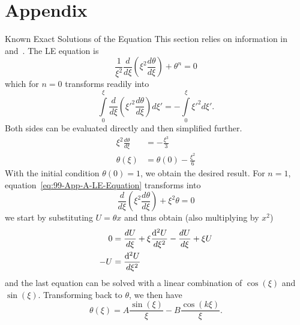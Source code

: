 \appendix
{}
\renewcommand{\thesection}{\Alph{section}}
\renewcommand{\thesubsection}{\Alph{subsection}}
\renewcommand\thetheorem{\thesubsection.\arabic{theorem}}

\section*{Appendix}
%
%
\begin{subsection}{Known Exact Solutions of the \texorpdfstring{}{LE} Equation}
\label{99-App-A-Exact-LE-Solutions}
This section relies on information in~\cite{weissteinLaneEmdenDifferentialEquation2020} and~\cite{chandrasekharChandrasekharAnIntroductionStudy1958}.
The \ac{LE} equation is
\begin{equation}
	\frac{1}{\xi^2}\frac{d}{d\xi}\left(\xi^2\frac{d\theta}{d\xi}\right)+\theta^n=0
	\label{eq:99-App-A-LE-Equation}
\end{equation}
which for $n=0$ transforms readily into
\begin{equation}
	\int\limits_0^\xi\frac{d}{d\xi}\left(\xi'^2\frac{d\theta}{d\xi}\right)d\xi' = -\int\limits_0^\xi\xi'^2 d\xi'.
	\label{eq:99-App-One-Integral-LE}
\end{equation}
Both sides can be evaluated directly and then simplified further.
\begin{align}
	\xi^2\frac{d\theta}{d\xi} &= -\frac{\xi^3}{3}\\
	\theta(\xi) &= \theta(0)-\frac{\xi^2}{6}
\end{align}
With the initial condition $\theta(0)=1$, we obtain the desired result.
For $n=1$, equation~\ref{eq:99-App-A-LE-Equation} transforms into
\begin{equation}
	\frac{d}{d\xi}\left(\xi^2\frac{d\theta}{d\xi}\right)+\xi^2\theta=0
	\label{eq:99-App-LE-Normal}
\end{equation}
we start by substituting $U=\theta x$ and thus obtain (also multiplying by $x^2$)
\begin{align}
	0 &= \frac{dU}{d\xi} + \xi\frac{\mathop{}\!\mathrm{d}^2  U}{d\xi^2} - \frac{dU}{d\xi} + \xi U\\
	-U &= \frac{\mathop{}\!\mathrm{d}^2  U}{d\xi^2}
\end{align}
and the last equation can be solved with a linear combination of $\cos(\xi)$ and $\sin(\xi)$.
Transforming back to $\theta$, we then have
\begin{equation}
	\theta(\xi) = A\frac{\sin(\xi)}{\xi} - B\frac{\cos(k\xi)}{\xi}.
	\label{eq:99-App-LE-Sol-N1-Ansatz}

\end{equation}
\end{subsection}
